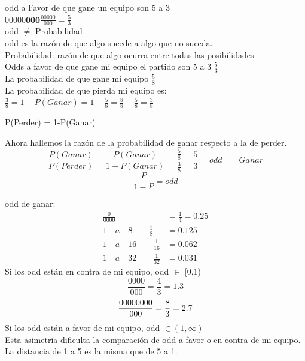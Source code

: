 \documentclass{report}
\begin{document}
odd a Favor de que gane un equipo son 5 a 3\\
$ 00000\textbf{000} \frac{00000}{000}=\frac{5}{3}$\\
odd $ \neq $ Probabilidad\\
odd es la razón de que algo sucede a algo que no suceda.\\
Probabilidad: razón de que algo ocurra entre todas las posibilidades.\\

Odds a favor de que gane mi equipo el partido son 5 a 3 $ \frac{5}{3} $\\

La probabilidad de que gane mi equipo $ \frac{5}{8} $\\

La probabilidad de que pierda mi equipo es:\\ $ \frac{3}{8}= 1 - P(Ganar) = 1-\frac{5}{8} = \frac{8}{8} - \frac{5}{8} = \frac{3}{8} $

P(Perder) = 1-P(Ganar)

Ahora hallemos la razón de la probabilidad de ganar respecto a la de perder.\\\[
\frac{P(Ganar)}{P(Perder)} = \frac{P(Ganar)}{1-P(Ganar)} = \frac{\frac{5}{8}}{\frac{3}{8}}=\frac{5}{3} = odd\qquad Ganar
\]
\[
\frac{P}{1-P}=odd
\]

odd de ganar:\\
\begin{align*}
\frac{0}{0000}&=\frac{1}{4}=0.25\\
1 \quad a\quad 8 \qquad\frac{1}{8}&=0.125\\
1 \quad a\quad 16 \qquad\frac{1}{16}&=0.062\\
1 \quad a\quad 32 \qquad\frac{1}{32}&=0.031
\end{align*}
Si los odd están en contra de mi equipo, odd $ \in $ [0,1)
\[
\frac{0000}{000} = \frac{4}{3}=1.3
\]
\[
\frac{00000000}{000} = \frac{8}{3} = 2.7\\
\]
Si los odd están a favor de mi equipo, odd $ \in (1, \infty) $\\

Esta asimetría  dificulta la comparación de odd a favor o en contra de mi equipo.\\

La distancia de 1 a 5 es la misma que de 5 a 1.
\end{document}
